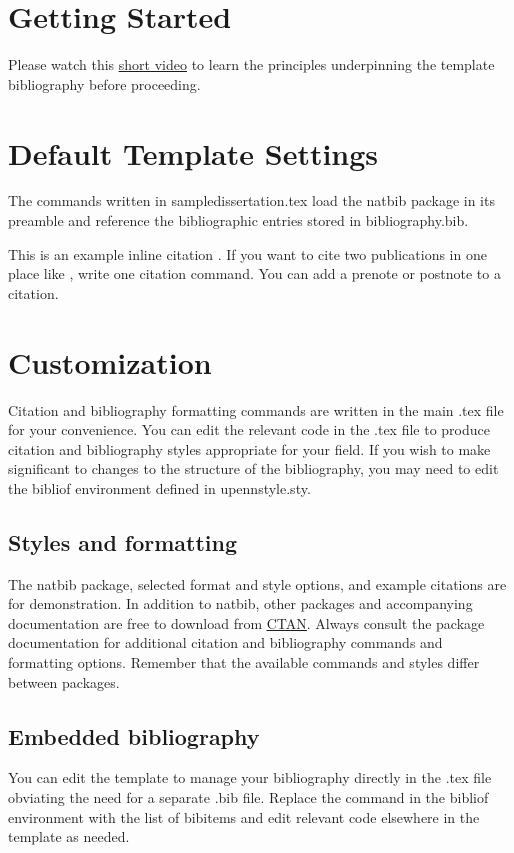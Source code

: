 \documentclass[11pt]{report}
\begin{document}
\begin{mainf}
\section{Getting Started}
Please watch this \underline{\href{https://mediaspace.library.upenn.edu/media/LaTeX+Fundamentals+-+6.1+Citations+\%26+Bibliographies+-+Think+in+LaTeX\%2C+BibTeX\%2C+and+BibLaTeX/1_7dyh4j58}{short video}} to learn the principles underpinning the template bibliography before proceeding.

\section{Default Template Settings}
The commands written in sampledissertation.tex load the natbib package in its preamble and reference the bibliographic entries stored in bibliography.bib.

This is an example inline citation \citep{heard_charles_2020}. 
If you want to cite two publications in one place like \citep{mcgoogan_chasing_2020,wright_for_2014}, write one citation command. You can add a prenote or postnote \citep[p.~78]{lake_white_1979} to a citation.

\section{Customization}
Citation and bibliography formatting commands are written in the main .tex file for your convenience. You can edit the relevant code in the .tex file to produce citation and bibliography styles appropriate for your field. If you wish to make significant to changes to the structure of the bibliography, you may need to edit the bibliof environment defined in upennstyle.sty.

\subsection{Styles and formatting}
The natbib package, selected format and style options, and example citations are for demonstration. In addition to natbib, other packages and accompanying documentation are free to download from \underline{\href{https://www.ctan.org}{CTAN}}. 
Always consult the package documentation for additional citation and bibliography commands and formatting options. Remember that the available commands and styles differ between packages.

\subsection{Embedded bibliography}
You can edit the template to manage your bibliography directly in the .tex file obviating the need for a separate .bib file. Replace the \verb|| command in the bibliof environment with the list of bibitems and edit relevant code elsewhere in the template as needed. 


\end{mainf}
\end{document}
